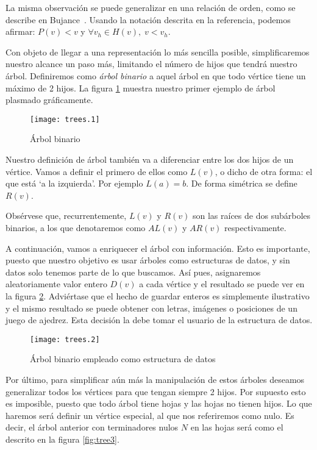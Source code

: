 \documentclass[10pt,spanish,twocolumn]{article}
\begin{document}
La misma observación se puede generalizar en una relación de orden, como se 
describe en Bujance~\cite[P2-3.21]{Bujance:05}.  Usando la notación descrita en 
la referencia, podemos afirmar: $P(v) < v$ y $\forall v_h \in H(v), \; v < 
v_h$.

Con objeto de llegar a una representación lo más sencilla posible, 
simplificaremos nuestro alcance un paso más, limitando el número de hijos que 
tendrá nuestro árbol.  Definiremos como \emph{árbol binario} a aquel árbol en 
que todo vértice tiene un máximo de 2 hijos.  La figura \ref{fig:tree1} muestra 
nuestro primer ejemplo de árbol plasmado gráficamente.

\begin{figure}[h]
    \centering
    \texttt{[image: trees.1]}
    \caption{Árbol binario}
    \label{fig:tree1}
\end{figure}

Nuestro definición de árbol también va a diferenciar entre los dos hijos de un 
vértice.  Vamos a definir el primero de ellos como $L(v)$, o dicho de otra 
forma: el que está `a la izquierda'.  Por ejemplo $L(a) = b$.  De forma 
simétrica se define $R(v)$.

Obsérvese que, recurrentemente, $L(v)$ y $R(v)$ son las raíces de dos 
subárboles binarios, a los que denotaremos como $AL(v)$ y $AR(v)$ 
respectivamente.

A continuación, vamos a enriquecer el árbol con información.  Esto es 
importante, puesto que nuestro objetivo es usar árboles como estructuras de 
datos, y sin datos solo tenemos parte de lo que buscamos.  Así pues, 
asignaremos aleatoriamente valor entero $D(v)$ a cada vértice y el resultado se 
puede ver en la figura \ref{fig:tree2}.  Adviértase que el hecho de guardar 
enteros es simplemente ilustrativo y el mismo resultado se puede obtener con 
letras, imágenes o posiciones de un juego de ajedrez.  Esta decisión la debe 
tomar el usuario de la estructura de datos.

\begin{figure}[h]
    \centering
    \texttt{[image: trees.2]}
    \caption{Árbol binario empleado como estructura de datos}
    \label{fig:tree2}
\end{figure}

Por último, para simplificar aún más la manipulación de estos árboles deseamos 
generalizar todos los vértices para que tengan siempre 2 hijos.  Por supuesto 
esto es imposible, puesto que todo árbol tiene hojas y las hojas no tienen 
hijos.  Lo que haremos será definir un vértice especial, al que nos referiremos 
como nulo.  Es decir, el árbol anterior con terminadores nulos $N$ en las hojas 
será como el descrito en la figura \ref{fig:tree3}.
\end{document}
